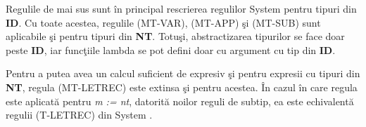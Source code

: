 Regulile de mai sus sunt \^ in principal rescrierea regulilor System \fhat pentru tipuri din \textbf{ID}. Cu toate acestea, regulile {\scriptsize (MT-VAR), (MT-APP)} \c si {\scriptsize (MT-SUB)} sunt aplicabile \c si pentru tipuri din \textbf{NT}. Totu\c si, abstractizarea tipurilor se face doar peste \textbf{ID}, iar func\c tiile lambda se pot defini doar cu argument cu tip din \textbf{ID}.

Pentru a putea avea un calcul suficient de expresiv \c si pentru expresii cu tipuri din \textbf{NT}, regula {\scriptsize (MT-LETREC)} este extinsa \c si pentru acestea. \^ In cazul \^ in care regula este aplicat\u a pentru \emph{m := nt}, datorit\u a noilor reguli de subtip, ea este echivalent\u a regulii {\scriptsize (T-LETREC)} din System \frec.

\begin{prooftree}
\end{prooftree}

